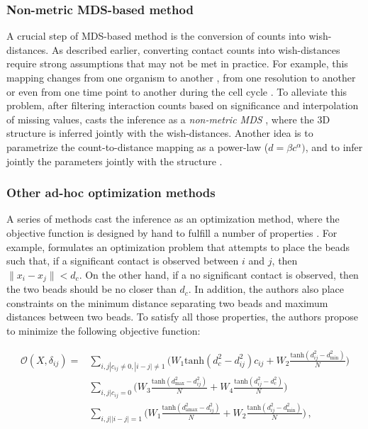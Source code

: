 \documentclass[2columns]{article}
\begin{document}
\subsubsection*{Non-metric MDS-based method}

A crucial step of MDS-based method is the conversion of counts into
wish-distances. As described earlier, converting contact counts into
wish-distances require strong assumptions that may not be met in practice. For
example, this mapping changes from one organism to another
\citep{fudenberg:higher-order}, from one resolution to another
\citep{zhang:inference} or even from one time point to another during the cell
cycle \citep{le:high-resolution, ay:three-dimensional}. To alleviate this
problem, after filtering interaction counts based on significance and
interpolation of missing values, \citet{ben-elazar:spatial} casts the
inference as a \emph{non-metric MDS} \citep{kruskal:multidimensional}, where
the 3D structure is inferred jointly with the wish-distances. Another idea is
to parametrize the count-to-distance mapping as a power-law ($d = \beta
c^\alpha)$, and to infer jointly the parameters jointly with the structure
\citep{zhang:inference, varoquaux:statistical}.

\subsubsection*{Other ad-hoc optimization methods}

A series of methods cast the inference as an optimization method, where the
objective function is designed by hand to fulfill a number of properties
\citep{trieu:large, trieu:MOGEN, trieu:3D}. For example, \citep{trieu:large}
formulates an optimization problem that attempts to place the beads such that,
if a significant contact is observed between $i$ and $j$, then $\| x_i - x_j
\| < d_c$. On the other hand, if a no significant contact is observed, then
the two beads should be no closer than $d_c$. In addition, the authors also
place constraints on the minimum distance separating two beads and maximum
distances between two beads. To satisfy all those properties, the authors
propose to minimize the following objective function:

\begin{equation*}
\begin{aligned}
\mathcal{O}(X, \delta_{ij}) = & \underset{i, j | c_{ij} \neq 0, |i-j| \neq 1}{\sum} \Bigg(W_1 \text{tanh}(d^2_c -
d^2_{ij}) c_{ij} + W_2 \frac{\text{tanh}(d^2_{ij} - d^2_\text{min})}{N} \Bigg) \\
& \underset{i, j | c_{ij} = 0}{\sum} \Bigg(W_3 \frac{\text{tanh}(d^2_\text{max} -
d^2_{ij})}{N} + W_4 \frac{\text{tanh}(d^2_{ij} -
d^2_{c})}{N}\Bigg) \\
& \underset{i, j | |i - j| = 1}{\sum} \Bigg(W_1 \frac{\text{tanh}(d^2_\text{amax} -
d^2_{ij})}{N} + W_2 \frac{\text{tanh}(d^2_{ij} -
d^2_\text{min})}{N}\Bigg) \,,\\
\end{aligned}
\end{equation*}
\end{document}
